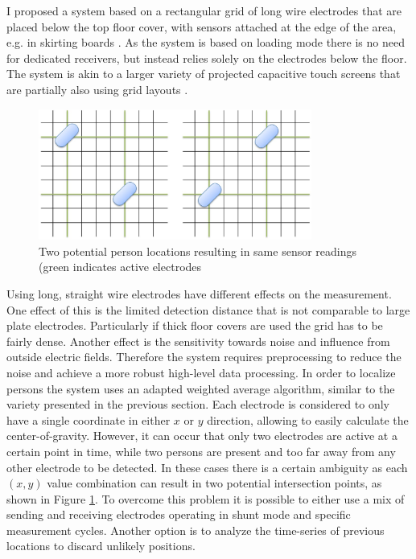I proposed a system based on a rectangular grid of long wire electrodes that are placed below the top floor cover, with sensors attached at the edge of the area, e.g. in skirting boards \cite{Braun2012CapFloor}. As the system is based on loading mode there is no need for dedicated receivers, but instead relies solely on the electrodes below the floor. The system is akin to a larger variety of projected capacitive touch screens that are partially also using grid layouts \cite{BarrettScreen}. 
\begin{figure}[h]
\centering
\includegraphics[width=0.8\textwidth]{images/capfloor_ghosting}
\caption{Two potential person locations resulting in same sensor readings (green indicates active electrodes}
\label{fig:capfloor_ghosting}
\end{figure}
Using long, straight wire electrodes have different effects on the measurement. One effect of this is the limited detection distance that is not comparable to large plate electrodes. Particularly if thick floor covers are used the grid has to be fairly dense. Another effect is the sensitivity towards noise and influence from outside electric fields. Therefore the system requires preprocessing to reduce the noise and achieve a more robust high-level data processing. In order to localize persons the system uses an adapted weighted average algorithm, similar to the variety presented in the previous section. Each electrode is considered to only have a single coordinate in either $x$ or $y$ direction, allowing to easily calculate the center-of-gravity. However, it can occur that only two electrodes are active at a certain point in time, while two persons are present and too far away from any other electrode to be detected. In these cases there is a certain ambiguity as each $(x,y)$ value combination can result in two potential intersection points, as shown in Figure \ref{fig:capfloor_ghosting}. To overcome this problem it is possible to either use a mix of sending and receiving electrodes operating in shunt mode and specific measurement cycles. Another option is to analyze the time-series of previous locations to discard unlikely positions.
